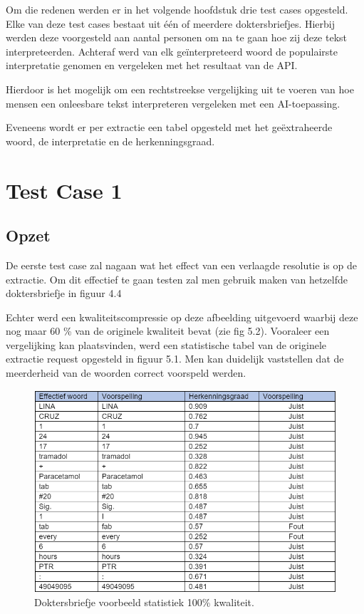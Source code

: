Om die redenen werden er in het volgende hoofdstuk drie test cases opgesteld. Elke van deze test cases bestaat uit één of meerdere doktersbriefjes. Hierbij werden deze voorgesteld aan aantal personen om na te gaan hoe zij deze tekst interpreteerden. Achteraf werd van elk geïnterpreteerd woord de populairste interpretatie genomen en vergeleken met het resultaat van de API.  

Hierdoor is het mogelijk om een rechtstreekse vergelijking uit te voeren van hoe mensen een onleesbare tekst interpreteren vergeleken met een AI-toepassing. 

Eveneens wordt er per extractie een tabel opgesteld met het geëxtraheerde woord, de interpretatie en de herkenningsgraad. 
\newpage
\section{Test Case 1}
\subsection{Opzet}
De eerste test case zal nagaan wat het effect van een verlaagde resolutie is op de extractie. Om dit effectief te gaan testen zal men gebruik maken van hetzelfde doktersbriefje in figuur 4.4 

Echter werd een kwaliteitscompressie op deze afbeelding uitgevoerd waarbij deze nog maar 60 \% van de originele kwaliteit bevat (zie fig 5.2). Vooraleer een vergelijking kan plaatsvinden, werd een statistische tabel van de originele extractie request opgesteld in figuur 5.1. Men kan duidelijk vaststellen dat de meerderheid van de woorden correct voorspeld werden.  

\begin{figure}[h]
	
	\includegraphics[width=\textwidth,height=\textheight,keepaspectratio]{../Foto's/doktersbriefje0_tabel}
	\captionsetup{justification=centering,margin=2cm}
	\caption{Doktersbriefje voorbeeld statistiek  100\% kwaliteit. \cite{}}
	\centering
\end{figure}
